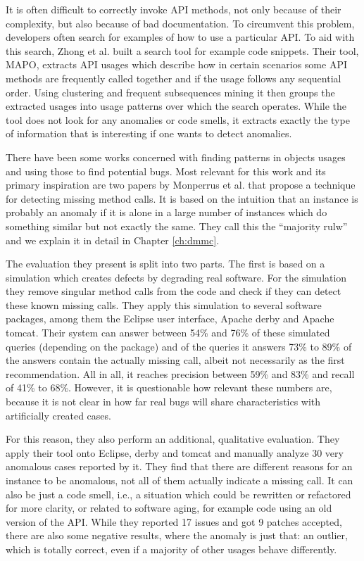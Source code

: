 It is often difficult to correctly invoke API methods, not only because of their complexity, but also because of bad documentation.
To circumvent this problem, developers often search for examples of how to use a particular API.
To aid with this search, Zhong et al. \cite{zhong2009mapo} built a search tool for example code snippets.
Their tool, MAPO, extracts API usages which describe how in certain scenarios some API methods are frequently called together and if the usage follows any sequential order.
Using clustering and frequent subsequences mining it then groups the extracted usages into usage patterns over which the search operates.
While the tool does not look for any anomalies or code smells, it extracts exactly the type of information that is interesting if one wants to detect anomalies.

There have been some works concerned with finding patterns in objects usages and using those to find potential bugs.
Most relevant for this work and its primary inspiration are two papers by Monperrus et al. \cite{monperrus2010detecting}\cite{monperrus2013detecting} that propose a technique for detecting missing method calls.
It is based on the intuition that an instance is probably an anomaly if it is alone in a large number of instances which do something similar but not exactly the same.
They call this the ``majority rulw'' and we explain it in detail in Chapter \ref{ch:dmmc}.

The evaluation they present is split into two parts.
The first is based on a simulation which creates defects by degrading real software.
For the simulation they remove singular method calls from the code and check if they can detect these known missing calls.
They apply this simulation to several software packages, among them the Eclipse user interface, Apache derby and Apache tomcat.
Their system can answer between 54\% and 76\% of these simulated queries (depending on the package) and of the queries it answers 73\% to 89\% of the answers contain the actually missing call, albeit not necessarily as the first recommendation.
All in all, it reaches precision between 59\% and 83\% and recall of 41\% to 68\%.
However, it is questionable how relevant these numbers are, because it is not clear in how far real bugs will share characteristics with artificially created cases.

For this reason, they also perform an additional, qualitative evaluation.
They apply their tool onto Eclipse, derby and tomcat and manually analyze 30 very anomalous cases reported by it.
They find that there are different reasons for an instance to be anomalous, not all of them actually indicate a missing call.
It can also be just a code smell, i.e., a situation which could be rewritten or refactored for more clarity, or related to software aging, for example code using an old version of the API.
While they reported 17 issues and got 9 patches accepted, there are also some negative results, where the anomaly is just that: an outlier, which is totally correct, even if a majority of other usages behave differently.

